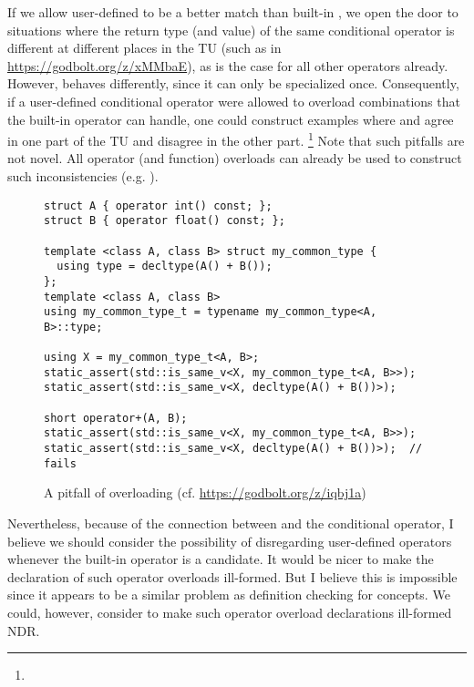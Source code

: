If we allow user-defined  to be a better match than built-in , we open the door to situations where the return type (and value) of the same conditional operator is different at different places in the TU (such as in \url{https://godbolt.org/z/xMMbaE}), as is the case for all other operators already.
However,  behaves differently, since it can only be specialized once.
Consequently, if a user-defined conditional operator were allowed to overload combinations that the built-in operator can handle, one could construct examples where  and  agree in one part of the TU and disagree in the other part.%
\footnote{}
Note that such pitfalls are not novel.
All operator (and function) overloads can already be used to construct such inconsistencies (e.g. ).

\begin{figure}[bht]
  \begin{lstlisting}[style=Vc]
struct A { operator int() const; };
struct B { operator float() const; };

template <class A, class B> struct my_common_type {
  using type = decltype(A() + B());
};
template <class A, class B>
using my_common_type_t = typename my_common_type<A, B>::type;

using X = my_common_type_t<A, B>;
static_assert(std::is_same_v<X, my_common_type_t<A, B>>);
static_assert(std::is_same_v<X, decltype(A() + B())>);

short operator+(A, B);
static_assert(std::is_same_v<X, my_common_type_t<A, B>>);
static_assert(std::is_same_v<X, decltype(A() + B())>);  // fails
  \end{lstlisting}
  \caption{A pitfall of overloading (cf. \url{https://godbolt.org/z/iqbj1a})}
  \label{fig:operator+}
\end{figure}

Nevertheless, because of the connection between  and the conditional operator, I believe we should consider the possibility of disregarding user-defined operators whenever the built-in operator is a candidate.
It would be nicer to make the declaration of such operator overloads ill-formed.
But I believe this is impossible since it appears to be a similar problem as definition checking for concepts.
We could, however, consider to make such operator overload declarations ill-formed NDR.

